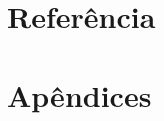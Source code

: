 \documentclass[12pt,a4paper,oneside]{memoir}
\begin{document}
%
%
%
%
%

\chapter*{Referência}


\chapter*{Apêndices}
\end{document}
